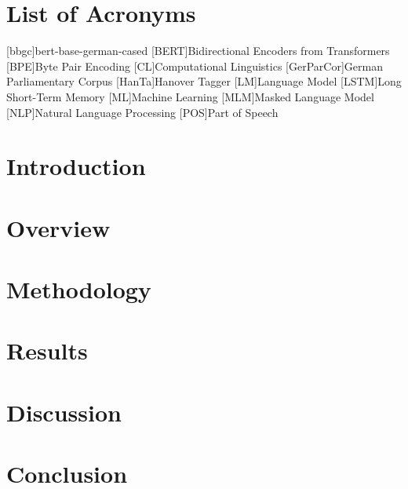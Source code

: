 \documentclass[12pt, a4paper, english]{ttlab-qualify}
\begin{document}
    \chapter*{List of Acronyms}
    \begin{acronym}
        [bbgc]{bert-base-german-cased}
        [BERT]{Bidirectional Encoders from Transformers}
        [BPE]{Byte Pair Encoding}
        [CL]{Computational Linguistics}
        [GerParCor]{German Parliamentary Corpus}
        [HanTa]{Hanover Tagger}
        [LM]{Language Model}
        [LSTM]{Long Short-Term Memory}
        [ML]{Machine Learning}
        [MLM]{Masked Language Model}
        [NLP]{Natural Language Processing}
        [POS]{Part of Speech}
    \end{acronym}

    \cleardoubleoddpage


    \chapter{Introduction}
    \label{ch:introduction}

    \chapter{Overview}
    \label{ch:overview}


    \chapter{Methodology}
    \label{ch:methodology}
    


    \chapter{Results}
    \label{ch:results}
    


    \chapter{Discussion}
    \label{ch:discussion}

    \chapter{Conclusion}
    \label{ch:conclusion}
\end{document}
